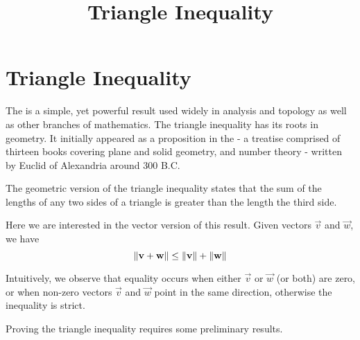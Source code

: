 \documentclass{ximera}
\title{Triangle Inequality} \license{CC BY-NC-SA 4.0}
\begin{document}
\begin{abstract}
 
\end{abstract}
\maketitle

\section*{Triangle Inequality}

The  is a simple, yet powerful result used widely in analysis and topology as well as other branches of mathematics.  The triangle inequality has its roots in geometry. It initially appeared as a proposition in the  - a treatise comprised of thirteen books covering plane and solid geometry, and number theory - written by Euclid of Alexandria around 300 B.C.

The geometric version of the triangle inequality states that the sum of the lengths of any two sides of a triangle is greater than the length the third side.  

Here we are interested in the vector version of this result.  Given vectors $\vec{v}$ and $\vec{w}$, we have
$$\left\lVert\mathbf{v}+\mathbf{w}\right\rVert\leq\left\lVert\mathbf{v}\right\rVert+\left\lVert\mathbf{w}\right\rVert$$

\begin{center}
\end{center}

Intuitively, we observe that equality occurs when either $\vec{v}$ or $\vec{w}$ (or both) are zero, or when non-zero vectors $\vec{v}$ and $\vec{w}$ point in the same direction, otherwise the inequality is strict.

Proving the triangle inequality requires some preliminary results.
\end{document}
